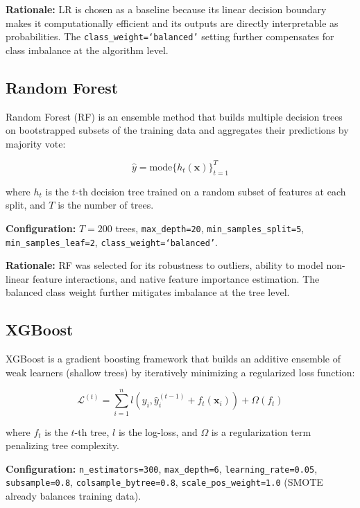 \documentclass[conference]{IEEEtran}
\begin{document}
\textbf{Rationale:} LR is chosen as a baseline because its linear decision boundary makes it computationally efficient and its outputs are directly interpretable as probabilities. The \texttt{class\_weight=`balanced'} setting further compensates for class imbalance at the algorithm level.

\subsection{Random Forest}

Random Forest (RF) \cite{breiman2001} is an ensemble method that builds multiple decision trees on bootstrapped subsets of the training data and aggregates their predictions by majority vote:

\begin{equation}
\hat{y} = \text{mode}\{h_t(\mathbf{x})\}_{t=1}^{T}
\end{equation}

where $h_t$ is the $t$-th decision tree trained on a random subset of features at each split, and $T$ is the number of trees.

\textbf{Configuration:} $T = 200$ trees, \texttt{max\_depth=20}, \texttt{min\_samples\_split=5}, \texttt{min\_samples\_leaf=2}, \texttt{class\_weight=`balanced'}.

\textbf{Rationale:} RF was selected for its robustness to outliers, ability to model non-linear feature interactions, and native feature importance estimation. The balanced class weight further mitigates imbalance at the tree level.

\subsection{XGBoost}

XGBoost \cite{chen2016} is a gradient boosting framework that builds an additive ensemble of weak learners (shallow trees) by iteratively minimizing a regularized loss function:

\begin{equation}
\mathcal{L}^{(t)} = \sum_{i=1}^{n} l(y_i, \hat{y}_i^{(t-1)} + f_t(\mathbf{x}_i)) + \Omega(f_t)
\end{equation}

where $f_t$ is the $t$-th tree, $l$ is the log-loss, and $\Omega$ is a regularization term penalizing tree complexity.

\textbf{Configuration:} \texttt{n\_estimators=300}, \texttt{max\_depth=6}, \texttt{learning\_rate=0.05}, \texttt{subsample=0.8}, \texttt{colsample\_bytree=0.8}, \texttt{scale\_pos\_weight=1.0} (SMOTE already balances training data).
\end{document}
